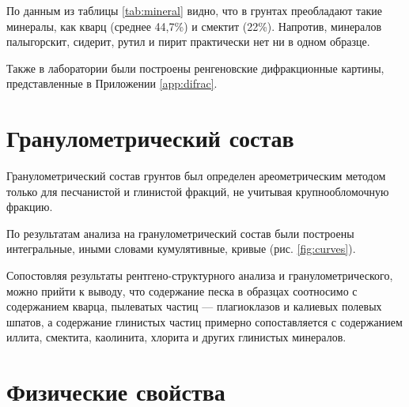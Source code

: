 По данным из таблицы \ref{tab:mineral} видно, что в грунтах преобладают такие 
минералы, как кварц (среднее 44,7\%) и смектит (22\%). Напротив, минералов 
палыгорскит, сидерит, рутил и пирит практически нет ни в одном образце. 

Также в лаборатории были построены ренгеновские дифракционные 
картины, представленные в Приложении \ref{app:difrac}. 

\section{Гранулометрический состав}

Гранулометрический состав грунтов был определен ареометрическим 
методом только для песчанистой и глинистой фракций, не учитывая 
крупнообломочную фракцию. 

По результатам анализа на гранулометрический состав были 
построены интегральные, иными словами кумулятивные, кривые (рис. \ref{fig:curves}).

{
\small

}


Сопостовляя результаты рентгено-структурного анализа и гранулометрического, 
можно прийти к выводу, что содержание песка в образцах соотносимо с 
содержанием кварца, пылеватых частиц --- плагиоклазов и калиевых
полевых шпатов, а содержание глинистых частиц примерно сопоставляется с 
содержанием иллита, смектита, каолинита, хлорита и других глинистых минералов.

\section{Физические свойства}


